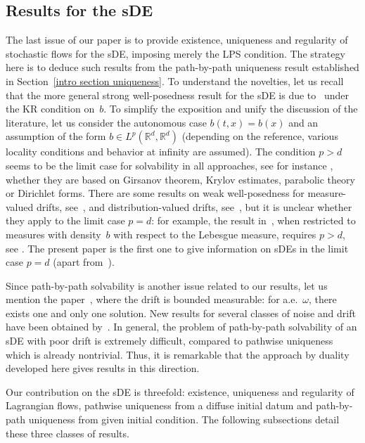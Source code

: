 \documentclass[a4paper,10pt]{article}
\newcommand\1{\mathbbm{1}}
\numberwithin{equation}{section}
\begin{document}
\subsection{Results for the sDE\label{intro section SDE}}

The last issue of our paper is to provide existence, uniqueness and regularity of stochastic flows for the sDE, imposing merely the LPS condition. The
strategy here is to deduce such results from the path-by-path uniqueness result established in Section~\ref{intro section uniqueness}. To understand the novelties, let us recall that the more general strong well-posedness result for the sDE is due to~\cite{KRYROE05} under the KR condition on~$b$. To simplify the exposition and unify the discussion of the literature, let us consider the autonomous case $b( t,x) =b( x) $ and an assumption of the form $b\in L^{p}( \mathbb{R}^{d},\mathbb{R}^{d}) $ (depending on the reference, various locality conditions and behavior at infinity are assumed). The condition $p>d$ seems to be the limit case for solvability in all approaches, see for instance \cite{KRYROE05,GYOMAR01,PORTENKO90,CHEZHA95,STANNAT99}, whether they are based on Girsanov theorem, Krylov estimates, parabolic theory or Dirichlet forms. There are some results on weak well-posedness for measure-valued drifts, see~\cite{BASCHE03}, and distribution-valued drifts, see~\cite{FLAISSRUS17,DELDIE16,CANCHO18}, but it is unclear whether they apply to the limit case $p=d$: for example, the result in~\cite{BASCHE03}, when restricted to measures with density~$b$ with respect to the Lebesgue measure, requires $p>d$, see \cite[Example 2.3]{BASCHE03}. The present paper is the first one to give information on sDEs in the limit case $p=d$ (apart from~\cite{NAM18,WLW17}).

Since path-by-path solvability is another issue related to our results, let us mention the paper~\cite{DAVIE07}, where the drift is bounded measurable: for a.e.~$\omega 
$, there exists one and only one solution. New results for several classes of noise and drift have been obtained by~\cite{CATGUB13}. In general, the problem of path-by-path solvability of an sDE with poor drift is extremely difficult, compared to pathwise uniqueness which is already nontrivial. Thus, it is remarkable that the
approach by duality developed here gives results in this direction. 

Our contribution on the sDE is threefold: existence, uniqueness and regularity of Lagrangian flows, pathwise uniqueness from a diffuse initial datum and path-by-path uniqueness from given initial condition. The following subsections detail these three classes of results. 
\end{document}
